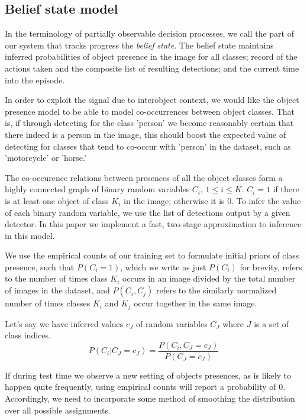\subsection{Belief state model}
In the terminology of partially observable decision processes, we call the part of our system that tracks progress the \emph{belief state}.
The belief state maintains inferred probabilities of object presence in the image for all classes; record of the actions taken and the composite list of resulting detections; and the current time into the episode.

In order to exploit the signal due to interobject context, we would like the object presence model to be able to model co-occurrences between object classes.
That is, if through detecting for the class 'person' we become reasonably certain that there indeed is a person in the image, this should boost the expected value of detecting for classes that tend to co-occur with 'person' in the dataset, such as 'motorcycle' or 'horse.'

The co-occurence relations between presences of all the object classes form a highly connected graph of binary random variables $C_i$, $1 \leq i \leq K$.
$C_i = 1$ if there is at least one object of class $K_i$ in the image; otherwise it is $0$.
To infer the value of each binary random variable, we use the list of detections output by a given detector.
In this paper we implement a fast, two-stage approximation to inference in this model.

We use the empirical counts of our training set to formulate initial priors of class presence, such that $P(C_i=1)$, which we write as just $P(C_i)$ for brevity, refers to the number of times class $K_i$ occurs in an image divided by the total number of images in the dataset, and $P(C_i, C_j)$ refers to the similarly normalized number of times classes $K_i$ and $K_j$ occur together in the same image.

Let's say we have inferred values $c_J$ of random variables $C_J$ where $J$ is a set of class indices.
\[
P(C_i|C_J=c_J)=\frac
{P(C_i, C_J=c_J)}
{P(C_J=c_J)}
\]

If during test time we observe a new setting of objects presences, as is likely to happen quite frequently, using empirical counts will report a probability of $0$.
Accordingly, we need to incorporate some method of smoothing the distribution over all possible assignments.

